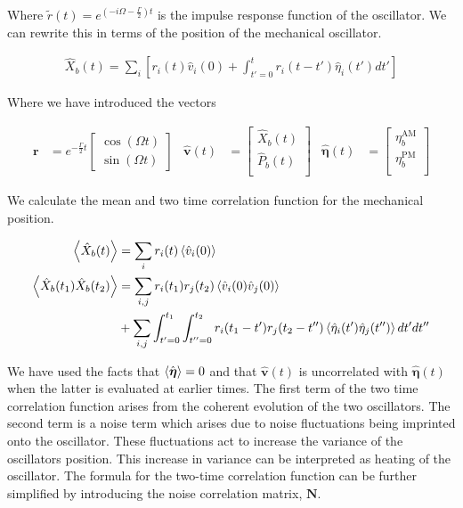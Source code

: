 \documentclass[12pt]{article}
\newcommand{\bv}[1]{\boldsymbol{#1}}
\newcommand{\nn}{\nonumber}
\begin{document}
Where $\tilde{r}(t) = e^{\left(-i \Omega - \frac{\Gamma}{2}\right)t}$ is the impulse response function of the oscillator. We can rewrite this in terms of the position of the mechanical oscillator.

\begin{align}
\hat{X}_b(t) = \sum_i \left[ r_i(t) \hat{v}_i(0) + \int_{t'=0}^t r_i(t-t') \hat{\eta}_i(t') dt' \right]
\end{align}

Where we have introduced the vectors

\begin{align}
\bv{r} &= e^{-\frac{\Gamma}{2} t}\begin{bmatrix}
\cos\left(\Omega t\right)\\
\sin\left(\Omega t\right)
\end{bmatrix} &
\hat{\bv{v}}(t) &= \begin{bmatrix}
\hat{X}_b(t)\\
\hat{P}_b(t)\\
\end{bmatrix} &
\hat{\bv{\eta}}(t) &= \begin{bmatrix}
\eta^{\text{AM}}_b \\
\eta^{\text{PM}}_b \\
\end{bmatrix}
\end{align}

We calculate the mean and two time correlation function for the mechanical position.

\begin{align}
\Braket{\hat{X}_b(t)} &= \sum_{i} r_i(t)\Braket{\hat{v}_i(0)}\\
\Braket{\hat{X}_b(t_1)\hat{X}_b(t_2)} &= \sum_{i,j} r_i(t_1) r_j(t_2) \Braket{\hat{v}_i(0)\hat{v}_j(0)} \nn \\
&+\sum_{i,j} \int_{t'=0}^{t_1} \int_{t''=0}^{t_2} r_i(t_1-t')r_j(t_2-t'') \Braket{\hat{\eta}_i(t')\hat{\eta}_j(t'')} dt'dt'' \nn 
\end{align}

We have used the facts that $\Braket{\hat{\bv{\eta}}} = 0$ and that $\hat{\bv{v}}(t)$ is uncorrelated with $\hat{\bv{\eta}}(t)$ when the latter is evaluated at earlier times. The first term of the two time correlation function arises from the coherent evolution of the two oscillators. The second term is a noise term which arises due to noise fluctuations being imprinted onto the oscillator. These fluctuations act to increase the variance of the oscillators position. This increase in variance can be interpreted as heating of the oscillator. The formula for the two-time correlation function can be further simplified by introducing the noise correlation matrix, $\bv{N}$.
\end{document}
